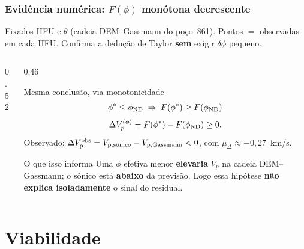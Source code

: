 \documentclass[aspectratio=169,10pt]{beamer}
\begin{document}
\begin{frame}[shrink=5]
  \frametitle{Evidência numérica: $F(\phi)$ monótona decrescente}
  \scriptsize
  Fixados HFU e $\theta$ (cadeia DEM--Gassmann do poço~861).
  Pontos $=$ \phiND{} observadas em cada HFU.
  Confirma a dedução de Taylor \textbf{sem} exigir $\delta\phi$ pequeno.
  \vspace{0.02cm}
  \begin{columns}[T,onlytextwidth]
    \begin{column}{0.52\textwidth}
    \end{column}
    \begin{column}{0.46\textwidth}
      \begin{block}{Mesma conclusão, via monotonicidade}
        \scriptsize
        \[
          \phi^{*}\le\phiND{}
          \;\Rightarrow\;
          F(\phi^{*})\ge F(\phiND{})
        \]
        \[
          \Delta V_p^{(\phi)}
          =
          F(\phi^{*})-F(\phiND{})
          \ge 0.
        \]
        Observado:
        \(\dVp^{\mathrm{obs}}
        =\Vpsonsub-V_{\mathrm{p,Gassmann}}<0\),
        com $\mu_\Delta\approx -0{,}27$~km/s.
      \end{block}
      \vspace{0.04cm}
      \begin{exampleblock}{O que isso informa}
        \scriptsize
        Uma $\phi$ efetiva menor \textbf{elevaria} $V_p$
        na cadeia DEM--Gassmann; o sônico está
        \textbf{abaixo} da previsão.
        Logo essa hipótese \textbf{não explica isoladamente}
        o sinal do residual.
      \end{exampleblock}
    \end{column}
  \end{columns}
\end{frame}

\section{Viabilidade}
\end{document}
